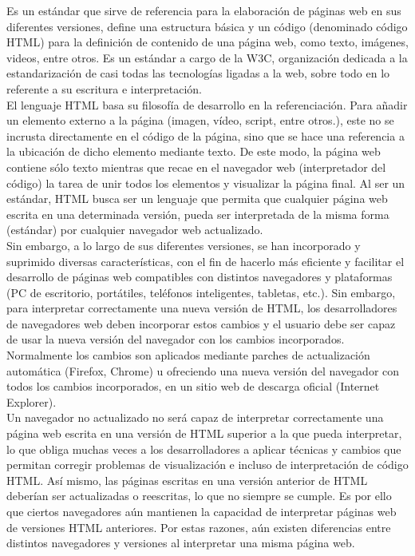 Es un estándar que sirve de referencia para la elaboración de páginas web en sus diferentes versiones, define una estructura básica y un código (denominado código HTML) para la definición de contenido de una página web, como texto, imágenes, videos, entre otros. Es un estándar a cargo de la W3C, organización dedicada a la estandarización de casi todas las tecnologías ligadas a la web, sobre todo en lo referente a su escritura e interpretación.\\

El lenguaje HTML basa su filosofía de desarrollo en la referenciación. Para añadir un elemento externo a la página (imagen, vídeo, script, entre otros.), este no se incrusta directamente en el código de la página, sino que se hace una referencia a la ubicación de dicho elemento mediante texto. De este modo, la página web contiene sólo texto mientras que recae en el navegador web (interpretador del código) la tarea de unir todos los elementos y visualizar la página final. Al ser un estándar, HTML busca ser un lenguaje que permita que cualquier página web escrita en una determinada versión, pueda ser interpretada de la misma forma (estándar) por cualquier navegador web actualizado.\\

Sin embargo, a lo largo de sus diferentes versiones, se han incorporado y suprimido diversas características, con el fin de hacerlo más eficiente y facilitar el desarrollo de páginas web compatibles con distintos navegadores y plataformas (PC de escritorio, portátiles, teléfonos inteligentes, tabletas, etc.). Sin embargo, para interpretar correctamente una nueva versión de HTML, los desarrolladores de navegadores web deben incorporar estos cambios y el usuario debe ser capaz de usar la nueva versión del navegador con los cambios incorporados. Normalmente los cambios son aplicados mediante parches de actualización automática (Firefox, Chrome) u ofreciendo una nueva versión del navegador con todos los cambios incorporados, en un sitio web de descarga oficial (Internet Explorer).\\

 Un navegador no actualizado no será capaz de interpretar correctamente una página web escrita en una versión de HTML superior a la que pueda interpretar, lo que obliga muchas veces a los desarrolladores a aplicar técnicas y cambios que permitan corregir problemas de visualización e incluso de interpretación de código HTML. Así mismo, las páginas escritas en una versión anterior de HTML deberían ser actualizadas o reescritas, lo que no siempre se cumple. Es por ello que ciertos navegadores aún mantienen la capacidad de interpretar páginas web de versiones HTML anteriores. Por estas razones, aún existen diferencias entre distintos navegadores y versiones al interpretar una misma página web.

